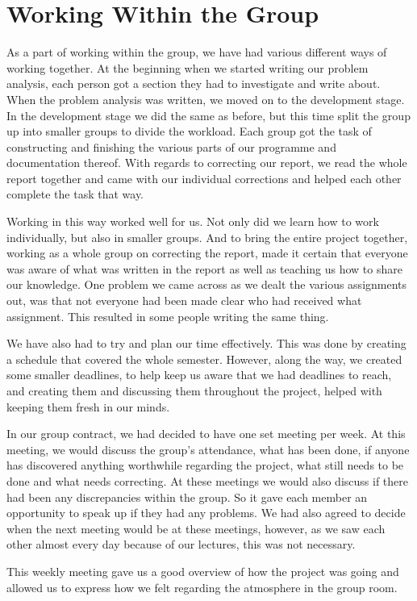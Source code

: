 \documentclass{article}
\begin{document}
\section{Working Within the Group}
As a part of working within the group, we have had various different ways of working together. 
At the beginning when we started writing our problem analysis, each person got a section they had to investigate and write about. 
When the problem analysis was written, we moved on to the development stage. 
In the development stage we did the same as before, but this time split the group up into smaller groups to divide the workload. 
Each group got the task of constructing and finishing the various parts of our programme and documentation thereof. 
With regards to correcting our report, we read the whole report together and came with our individual corrections and helped each other complete the task that way.

Working in this way worked well for us. Not only did we learn how to work individually, but also in smaller groups. 
And to bring the entire project together, working as a whole group on correcting the report, made it certain that everyone was aware of what was written in the report as well as teaching us how to share our knowledge.
One problem we came across as we dealt the various assignments out, was that not everyone had been made clear who had received what assignment. This resulted in some people writing the same thing.

We have also had to try and plan our time effectively. 
This was done by creating a schedule that covered the whole semester. 
However, along the way, we created some smaller deadlines, to help keep us aware that we had deadlines to reach, and creating them and discussing them throughout the project, helped with keeping them fresh in our minds.

In our group contract, we had decided to have one set meeting per week. At this meeting, we would discuss the group's attendance, what has been done, if anyone has discovered anything worthwhile regarding the project, what still needs to be done and what needs correcting. 
At these meetings we would also discuss if there had been any discrepancies within the group. So it gave each member an opportunity to speak up if they had any problems.
We had also agreed to decide when the next meeting would be at these meetings, however, as we saw each other almost every day because of our lectures, this was not necessary.

This weekly meeting gave us a good overview of how the project was going and allowed us to express how we felt regarding the atmosphere in the group room. 
\end{document}

